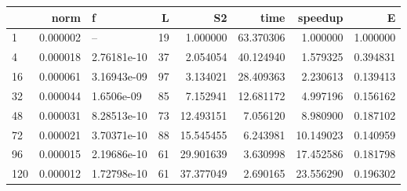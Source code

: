 \begin{tabular}{lrlrrrrr}
\toprule
{} &      norm &            f &   L &         S2 &       time &    speedup &         E \\
\midrule
1   &  0.000002 &           -- &  19 &   1.000000 &  63.370306 &   1.000000 &  1.000000 \\
4   &  0.000018 &  2.76181e-10 &  37 &   2.054054 &  40.124940 &   1.579325 &  0.394831 \\
16  &  0.000061 &  3.16943e-09 &  97 &   3.134021 &  28.409363 &   2.230613 &  0.139413 \\
32  &  0.000044 &   1.6506e-09 &  85 &   7.152941 &  12.681172 &   4.997196 &  0.156162 \\
48  &  0.000031 &  8.28513e-10 &  73 &  12.493151 &   7.056120 &   8.980900 &  0.187102 \\
72  &  0.000021 &  3.70371e-10 &  88 &  15.545455 &   6.243981 &  10.149023 &  0.140959 \\
96  &  0.000015 &  2.19686e-10 &  61 &  29.901639 &   3.630998 &  17.452586 &  0.181798 \\
120 &  0.000012 &  1.72798e-10 &  61 &  37.377049 &   2.690165 &  23.556290 &  0.196302 \\
\bottomrule
\end{tabular}
